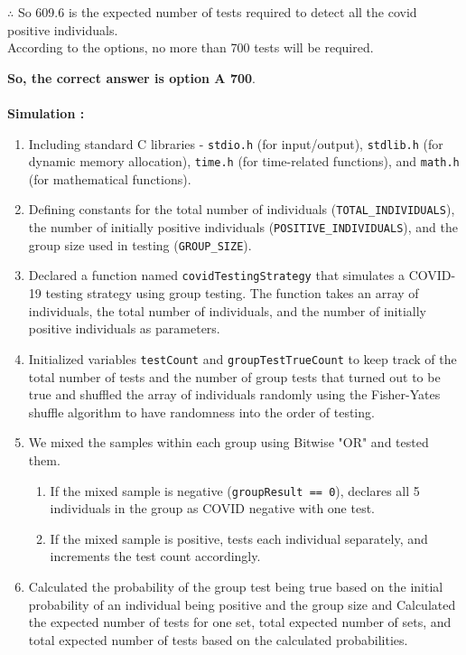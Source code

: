 \documentclass[journal,12pt,onecolumn]{IEEEtran}
\begin{document}
$\therefore$ So 609.6 is the expected number of tests required to detect all the covid positive individuals. \\
According to the options, no more than 700 tests will be required.

\textbf{So, the correct answer is option A 700}. \\ \\
\textbf{Simulation :} \\ 
\begin{enumerate}
    \item Including standard C libraries - \texttt{stdio.h} (for input/output), \texttt{stdlib.h} (for dynamic memory allocation), \texttt{time.h} (for time-related functions), and \texttt{math.h} (for mathematical functions). \\
    \item Defining constants for the total number of individuals (\texttt{TOTAL\_INDIVIDUALS}), the number of initially positive individuals (\texttt{POSITIVE\_INDIVIDUALS}), and the group size used in testing (\texttt{GROUP\_SIZE}). \\
    \item Declared a function named \texttt{covidTestingStrategy} that simulates a COVID-19 testing strategy using group testing. The function takes an array of individuals, the total number of individuals, and the number of initially positive individuals as parameters. \\
    \item Initialized variables \texttt{testCount} and \texttt{groupTestTrueCount} to keep track of the total number of tests and the number of group tests that turned out to be true and shuffled the array of individuals randomly using the Fisher-Yates shuffle algorithm to have randomness into the order of testing. \\
    \item We mixed the samples within each group using Bitwise "OR" and tested them.\\
    \begin{enumerate}
        \item If the mixed sample is negative (\texttt{groupResult == 0}), declares all 5 individuals in the group as COVID negative with one test.
        \item If the mixed sample is positive, tests each individual separately, and increments the test count accordingly.
    \end{enumerate} 
    \item Calculated the probability of the group test being true based on the initial probability of an individual being positive and the group size and Calculated the expected number of tests for one set, total expected number of sets, and total expected number of tests based on the calculated probabilities. \\

\end{enumerate}
\end{document}
